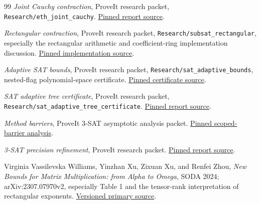 \begin{thebibliography}{99}
\emph{Joint Cauchy contraction}, ProveIt research packet,
\texttt{Research/eth\_joint\_cauchy}.
\href{https://github.com/VladimirReshetnikov/ProveIt/blob/8e76d515063c4b9fbd8743a846b457e3a01bc039/Computability/SubexponentialSAT/Research/eth_joint_cauchy/report.tex}{Pinned report source}.

\emph{Rectangular contraction}, ProveIt research packet,
\texttt{Research/subsat\_rectangular}, especially the rectangular
arithmetic and coefficient-ring implementation discussion.
\href{https://github.com/VladimirReshetnikov/ProveIt/blob/8e76d515063c4b9fbd8743a846b457e3a01bc039/Computability/SubexponentialSAT/Research/subsat_rectangular/sections/rectangular.tex}{Pinned implementation source}.

\emph{Adaptive SAT bounds}, ProveIt research packet,
\texttt{Research/sat\_adaptive\_bounds}, nested-flag polynomial-space
certificate.
\href{https://github.com/VladimirReshetnikov/ProveIt/blob/8e76d515063c4b9fbd8743a846b457e3a01bc039/Computability/SubexponentialSAT/Research/sat_adaptive_bounds/report/flags.tex}{Pinned certificate source}.

\emph{SAT adaptive tree certificate}, ProveIt research packet,
\nolinkurl{Research/sat_adaptive_tree_certificate}.
\href{https://github.com/VladimirReshetnikov/ProveIt/blob/8e76d515063c4b9fbd8743a846b457e3a01bc039/Computability/SubexponentialSAT/Research/sat_adaptive_tree_certificate/report.tex}{Pinned report source}.

\emph{Method barriers}, ProveIt 3-SAT asymptotic analysis packet.
\href{https://github.com/VladimirReshetnikov/ProveIt/blob/8e76d515063c4b9fbd8743a846b457e3a01bc039/Computability/SubexponentialSAT/Research/3sat_asymptotic_analysis/research_runtime/METHOD_BARRIERS.md}{Pinned scoped-barrier analysis}.

\emph{3-SAT precision refinement}, ProveIt research packet.
\href{https://github.com/VladimirReshetnikov/ProveIt/blob/8e76d515063c4b9fbd8743a846b457e3a01bc039/Computability/SubexponentialSAT/Research/3sat_precision_refinement/report.tex}{Pinned report source}.

Virginia Vassilevska Williams, Yinzhan Xu, Zixuan Xu, and Renfei Zhou,
\emph{New Bounds for Matrix Multiplication: from Alpha to Omega},
SODA 2024; arXiv:2307.07970v2, especially Table 1 and the tensor-rank
interpretation of rectangular exponents.
\href{https://arxiv.org/html/2307.07970v2}{Versioned primary source}.


\end{thebibliography}
